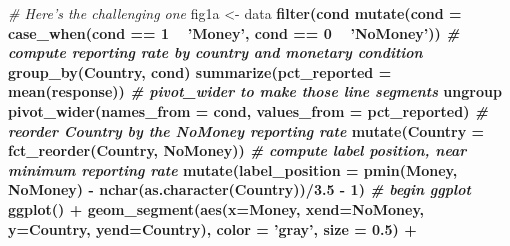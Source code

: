 \documentclass[12pt,halfline,a4paper,]{ouparticle}
\newenvironment{Shaded}{\begin{snugshade}}{\end{snugshade}}
\newcommand{\CommentTok}[1]{\textcolor[rgb]{0.56,0.35,0.01}{\textit{#1}}}
\newcommand{\DataTypeTok}[1]{\textcolor[rgb]{0.13,0.29,0.53}{#1}}
\newcommand{\DecValTok}[1]{\textcolor[rgb]{0.00,0.00,0.81}{#1}}
\newcommand{\FloatTok}[1]{\textcolor[rgb]{0.00,0.00,0.81}{#1}}
\newcommand{\KeywordTok}[1]{\textcolor[rgb]{0.13,0.29,0.53}{\textbf{#1}}}
\newcommand{\NormalTok}[1]{#1}
\newcommand{\OperatorTok}[1]{\textcolor[rgb]{0.81,0.36,0.00}{\textbf{#1}}}
\newcommand{\StringTok}[1]{\textcolor[rgb]{0.31,0.60,0.02}{#1}}
\begin{document}
\begin{Shaded}
\begin{Highlighting}[]
\CommentTok{# Here's the challenging one}
\NormalTok{fig1a <-}\StringTok{ }\NormalTok{data }\OperatorTok{%
\StringTok{  }\KeywordTok{filter}\NormalTok{(cond }\OperatorTok{%
\StringTok{  }\KeywordTok{mutate}\NormalTok{(}\DataTypeTok{cond =} \KeywordTok{case_when}\NormalTok{(cond }\OperatorTok{==}\StringTok{ }\DecValTok{1} \OperatorTok{~}\StringTok{ 'Money'}\NormalTok{, }
\NormalTok{                          cond }\OperatorTok{==}\StringTok{ }\DecValTok{0} \OperatorTok{~}\StringTok{ 'NoMoney'}\NormalTok{)) }\OperatorTok{%
\StringTok{  }\CommentTok{# compute reporting rate by country and monetary condition}
\StringTok{  }\KeywordTok{group_by}\NormalTok{(Country,}
\NormalTok{           cond) }\OperatorTok{%
\StringTok{  }\KeywordTok{summarize}\NormalTok{(}\DataTypeTok{pct_reported =} \KeywordTok{mean}\NormalTok{(response)) }\OperatorTok{%
\StringTok{  }\CommentTok{# pivot_wider to make those line segments}
\StringTok{  }\NormalTok{ungroup }\OperatorTok{%
\StringTok{  }\KeywordTok{pivot_wider}\NormalTok{(}\DataTypeTok{names_from =}\NormalTok{ cond, }\DataTypeTok{values_from =}\NormalTok{ pct_reported) }\OperatorTok{%
\StringTok{  }\CommentTok{# reorder Country by the NoMoney reporting rate }
\StringTok{  }\KeywordTok{mutate}\NormalTok{(}\DataTypeTok{Country =} \KeywordTok{fct_reorder}\NormalTok{(Country, NoMoney)) }\OperatorTok{%
\StringTok{  }\CommentTok{# compute label position, near minimum reporting rate}
\StringTok{  }\KeywordTok{mutate}\NormalTok{(}\DataTypeTok{label_position =} \KeywordTok{pmin}\NormalTok{(Money, NoMoney) }\OperatorTok{-}\StringTok{ }\KeywordTok{nchar}\NormalTok{(}\KeywordTok{as.character}\NormalTok{(Country))}\OperatorTok{/}\FloatTok{3.5} \OperatorTok{-}\StringTok{ }\DecValTok{1}\NormalTok{) }\OperatorTok{%
\StringTok{  }\CommentTok{# begin ggplot}
\StringTok{  }\KeywordTok{ggplot}\NormalTok{() }\OperatorTok{+}
\StringTok{  }\KeywordTok{geom_segment}\NormalTok{(}\KeywordTok{aes}\NormalTok{(}\DataTypeTok{x=}\NormalTok{Money, }\DataTypeTok{xend=}\NormalTok{NoMoney, }\DataTypeTok{y=}\NormalTok{Country, }\DataTypeTok{yend=}\NormalTok{Country),}
               \DataTypeTok{color =} \StringTok{'gray'}\NormalTok{, }\DataTypeTok{size =} \FloatTok{0.5}\NormalTok{) }\OperatorTok{+}\StringTok{ }
}}}}}}}}}
\end{Highlighting}
\end{Shaded}
\end{document}
